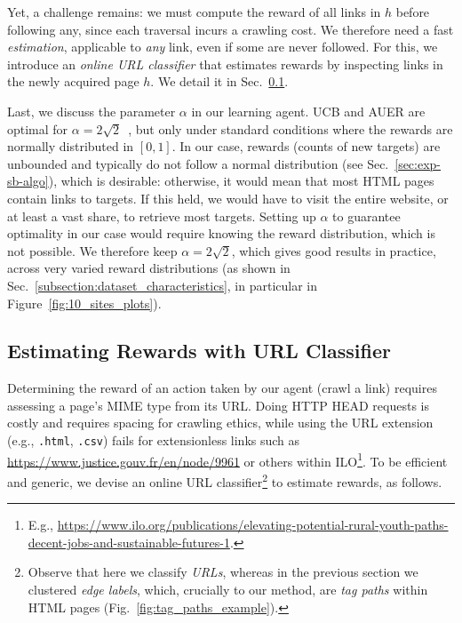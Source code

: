 Yet, a challenge remains: we must compute the reward of all links in $h$ before following any, since each traversal incurs a crawling cost. We therefore need a fast \emph{estimation}, applicable to \emph{any} link, even if some are never followed. For this, we introduce an \emph{online URL classifier} that estimates rewards by inspecting links in the newly acquired page $h$. We detail it in Sec.~\ref{subsection:url_classifier}.

Last, we discuss the parameter $\alpha$ in our learning agent.
UCB and AUER are optimal for 
$\alpha=2\sqrt{2}$~\cite{auer2002finite,kleinberg2010regret}, but only under standard conditions where the rewards are normally
distributed in $[0, 1]$. In our case, rewards (counts of new targets)
 are unbounded and typically do not follow a normal
distribution (see Sec.~\ref{sec:exp-sb-algo}), which is desirable: otherwise, it would mean that most HTML pages contain links to targets. If this held, we would have to visit the entire website, or at least a vast share, to retrieve most targets.
Setting up $\alpha$ to guarantee optimality in our case would require knowing the reward distribution, which is not possible.
We therefore keep $\alpha=2\sqrt{2}$, which gives good results in practice,  across very varied reward distributions (as shown in Sec.~\ref{subsection:dataset_characteristics}, in particular in Figure~\ref{fig:10_sites_plots}).

\subsection{Estimating Rewards with URL Classifier}\label{subsection:url_classifier}

Determining the reward of an action taken by our agent (crawl a link) requires assessing a page's MIME type from its URL.
Doing HTTP HEAD requests is costly and requires spacing for crawling ethics, while using the URL extension (e.g., \texttt{.html}, \texttt{.csv}) fails for extensionless links such as \url{https://www.justice.gouv.fr/en/node/9961} or others within ILO\footnote{E.g., \url{https://www.ilo.org/publications/elevating-potential-rural-youth-paths-decent-jobs-and-sustainable-futures-1}.}.
To be efficient and generic, we devise an
online URL classifier\footnote{Observe that here we classify
\emph{URLs}, whereas in the previous section we clustered \emph{edge labels}, which, crucially to our method, are \emph{tag paths} within HTML pages (Fig.~\ref{fig:tag_paths_example}).} to estimate rewards, as follows.

